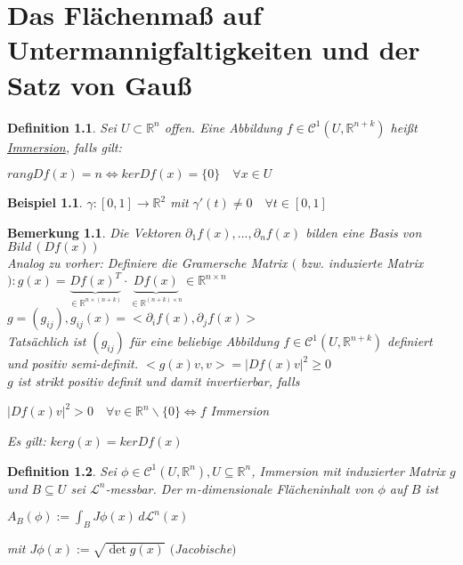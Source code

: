 \documentclass[11pt]{memoir}
\theoremstyle{changebreak}
\newtheorem{Definition}{Definition}[chapter]
\newtheorem{Bemerkung}{Bemerkung}[chapter]
\newtheorem{Beispiel}{Beispiel}[chapter]
\begin{document}
\chapter{Das Flächenmaß auf Untermannigfaltigkeiten und der Satz von Gauß}

\begin{Definition}
Sei $U \subset \mathbb R^n$ offen. Eine Abbildung $f \in \mathscr C^1(U, \mathbb R^{n+k})$ heißt \underline{Immersion}, falls gilt:
\begin{center}
	$ rang D f(x) = n \Leftrightarrow ker D f(x) = \{0\}\quad \forall x \in U$
\end{center}
\end{Definition}

\begin{Beispiel}
$\gamma: [0, 1] \rightarrow \mathbb R^2$ mit $\gamma'(t) \ne 0\quad \forall t \in [0,1]$
\end{Beispiel}

\begin{Bemerkung}
Die Vektoren $\partial_1 f(x), ..., \partial_n f(x)$ bilden eine Basis von $Bild\,(Df(x))$ \\
Analog zu vorher: Definiere die Gramersche Matrix $($ bzw. induzierte Matrix$): g(x) = \underbrace{Df(x)^T}_{\in \mathbb R^{n \times (n+k)}}\cdotp \underbrace{Df(x)}_{\in \mathbb R^{(n+k) \times n}} \in \mathbb R^{n\times n}$ \\
$g= (g_{ij}), g_{ij}(x) = <\partial_i f(x), \partial_j f(x)>$ \\
Tatsächlich ist $(g_{ij})$ für eine beliebige Abbildung $f \in \mathscr C^1(U, \mathbb R^{n+k})$ definiert und positiv semi-definit. $<g(x)v, v> = |Df(x)v|^2 \geq 0$ \\
$g$ ist strikt positiv definit und damit invertierbar, falls
\begin{center}
	$|Df(x)v|^2 > 0\quad \forall v \in \mathbb R^n \backslash \{0\} \Leftrightarrow f$ Immersion
\end{center}
Es gilt: $ker g(x) = ker Df(x)$
\end{Bemerkung}

\begin{Definition}
Sei $\phi \in \mathscr C^1(U, \mathbb R^n), U \subseteq \mathbb R^n$, Immersion mit induzierter Matrix $g$ und $B \subseteq U$ sei $\mathscr L^n$-messbar. Der $m$-dimensionale Flächeninhalt von $\phi$ auf $B$ ist
\begin{center}
	$A_B(\phi) := \int_B J \phi(x) \, d \mathscr L^n(x)$
\end{center}
mit $J\phi(x) := \sqrt{\det g(x)}$ $($Jacobische$)$
\end{Definition}
\end{document}
